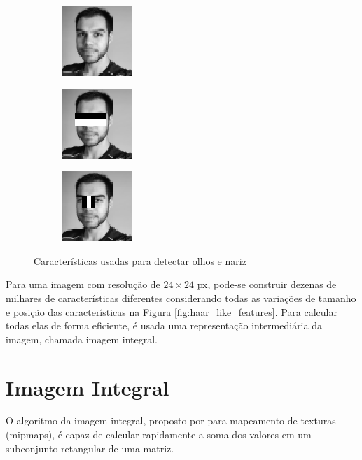 \begin{figure}[htbp]
    \begin{subfigure}[c]{0.3\textwidth}
    \centering
    \includegraphics{imagens/julio_haar1.png}
    \caption{}
    \end{subfigure}
    \begin{subfigure}[c]{0.3\textwidth}
    \centering
    \includegraphics{imagens/julio_haar2.png}
    \caption{}
    \end{subfigure}
    \begin{subfigure}[c]{0.3\textwidth}
    \centering
    \includegraphics{imagens/julio_haar3.png}
    \caption{}
    \end{subfigure}
    \caption{Características usadas para detectar olhos e nariz}
    \label{fig:julio_haar}
\end{figure}

Para uma imagem com resolução de $24\times24$ px, pode-se construir dezenas de milhares de características diferentes considerando todas as variações de tamanho e posição das características na Figura \ref{fig:haar_like_features}. Para calcular todas elas de forma eficiente, é usada uma representação intermediária da imagem, chamada imagem integral.


\section{Imagem Integral}\label{sec:imagem_integral}

O algoritmo da imagem integral, proposto por  para mapeamento de texturas (mipmaps), é capaz de calcular rapidamente a soma dos valores em um subconjunto retangular de uma matriz.

